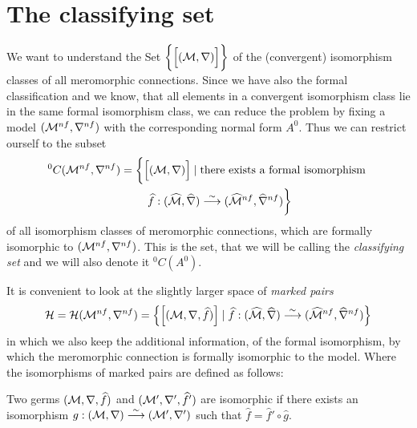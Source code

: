 \section{The classifying set}
We want to understand the Set
$\bigg\{\Big[(\mathcal{M},\nabla)\Big]\bigg\}$ of the (convergent)
isomorphism classes of all meromorphic connections. Since we have also the
formal classification and we know, that all elements in a convergent
isomorphism class lie in the same formal isomorphism class, we can reduce the
problem by fixing a model $(\mathcal{M}^{nf},\nabla^{nf})$ with the corresponding
normal form $A^0$. Thus we can restrict ourself to the subset
\begin{multline*}
  {}^0C(\mathcal{M}^{nf},\nabla^{nf})=\bigg\{
    \Big[(\mathcal{M},\nabla)\Big]
    \mid \text{there exists a formal isomorphism }
  \\\qquad\widehat f:(\widehat{\mathcal{M}},\widehat\nabla)
      \overset{\sim}\longrightarrow
      (\widehat{\mathcal{M}}^{nf},\widehat\nabla^{nf})
  \bigg\}
\end{multline*}
of all isomorphism classes of meromorphic connections, which are formally
isomorphic to $(\mathcal{M}^{nf},\nabla^{nf})$. This is the set, that we will be
calling the \emph{classifying set} and we will also denote it ${}^0C(A^0)$.
\begin{comment}
  \begin{itemize}
    \item \cite{thboalch} p.6
      \begin{itemize}
        \item \cite{boalch} p.19
      \end{itemize}
    \item \cite{Loday1994} p.852
    \item \cite{sabbah2007isomonodromic} p.111
    \item \cite{babbitt1983}
  \end{itemize}
\end{comment}

It is convenient to look at the slightly larger space of \emph{marked pairs}
\[
  \mathcal{H}=\mathcal{H}(\mathcal{M}^{nf},\nabla^{nf})=\left\{
    \left[(\mathcal{M},\nabla,\widehat f)\right]
      \mid
      \widehat f:(\widehat{\mathcal{M}},\widehat\nabla)
        \overset{\sim}\longrightarrow
        (\widehat{\mathcal{M}}^{nf},\widehat\nabla^{nf})
  \right\}
\]
in which we also keep the additional information, of the formal isomorphism, by
which the meromorphic connection is formally isomorphic to the model.
Where the isomorphisms of marked pairs are defined as follows:
\begin{defn}
  Two germs $(\mathcal{M},\nabla,\widehat f)$ and $(\mathcal{M}',\nabla',\widehat f')$ are
  isomorphic if there exists an isomorphism
  $g:(\mathcal{M},\nabla)\overset{\sim}\longrightarrow(\mathcal{M}',\nabla')$ such that
  $\hat f=\hat f'\circ \hat g$.
  \begin{comment}
    \cite[111]{sabbah2007isomonodromic}:\dots it is important to remark that
    such an isomorphism is then unique.
  \end{comment}
\end{defn}

